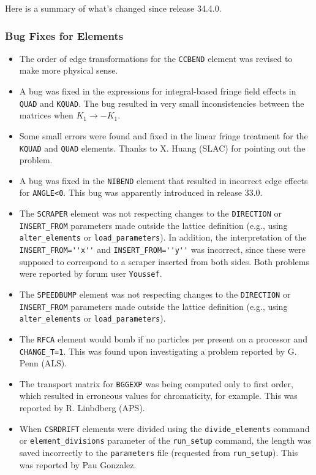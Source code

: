 \documentclass[11pt]{article}
\begin{document}
Here is a summary of what's changed since release 34.4.0.

\subsubsection{Bug Fixes for Elements}

\begin{itemize}
\item The order of edge transformations for the \verb|CCBEND| element was revised to make more physical sense.
\item A bug was fixed in the expressions for integral-based fringe field effects in \verb|QUAD| and \verb|KQUAD|.
  The bug resulted in very small inconsistencies between the matrices when $K_1 \rightarrow -K_1$.
\item Some small errors were found and fixed in the linear fringe treatment for the \verb|KQUAD| and \verb|QUAD| elements.
  Thanks to X. Huang (SLAC) for pointing out the problem.
\item A bug was fixed in the \verb|NIBEND| element that resulted in incorrect edge effects for \verb|ANGLE<0|.
  This bug was apparently introduced in release 33.0.
\item The \verb|SCRAPER| element was not respecting changes to the \verb|DIRECTION| or \verb|INSERT_FROM| parameters 
  made outside the lattice definition (e.g., using \verb|alter_elements| or \verb|load_parameters|). In addition,
  the interpretation of the \verb|INSERT_FROM=''x''| and \verb|INSERT_FROM=''y''| was incorrect, since these were
  supposed to correspond to a scraper inserted from both sides. Both problems were reported by forum user 
  \verb|Youssef|.
\item The \verb|SPEEDBUMP| element was not respecting changes to the \verb|DIRECTION| or \verb|INSERT_FROM| parameters 
  made outside the lattice definition (e.g., using \verb|alter_elements| or \verb|load_parameters|).
\item The \verb|RFCA| element would bomb if no particles per present on a processor and \verb|CHANGE_T=1|. This
  was found upon investigating a problem reported by G. Penn (ALS).
\item The transport matrix for \verb|BGGEXP| was being computed only to first order, which resulted in erroneous
  values for chromaticity, for example. This was reported by R. Linbdberg (APS).
\item When \verb|CSRDRIFT| elements were divided using the \verb|divide_elements| command or \verb|element_divisions|
  parameter of the \verb|run_setup| command, the length was saved incorrectly to the \verb|parameters| file (requested
  from \verb|run_setup|). This was reported by Pau Gonzalez.
\end{itemize}
\end{document}
